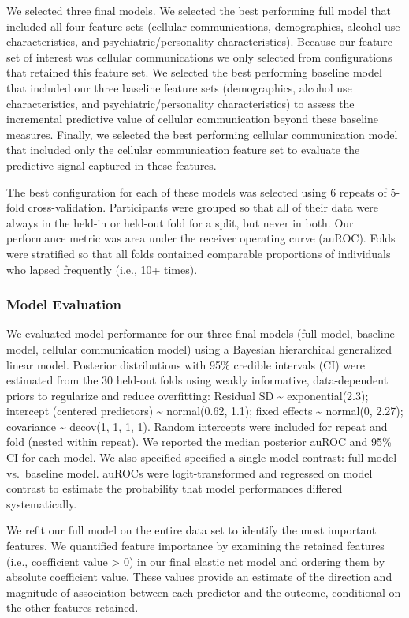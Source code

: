 \documentclass[
  letterpaper,
  DIV=11,
  numbers=noendperiod]{scrartcl}
\begin{document}
We selected three final models. We selected the best performing full
model that included all four feature sets (cellular communications,
demographics, alcohol use characteristics, and psychiatric/personality
characteristics). Because our feature set of interest was cellular
communications we only selected from configurations that retained this
feature set. We selected the best performing baseline model that
included our three baseline feature sets (demographics, alcohol use
characteristics, and psychiatric/personality characteristics) to assess
the incremental predictive value of cellular communication beyond these
baseline measures. Finally, we selected the best performing cellular
communication model that included only the cellular communication
feature set to evaluate the predictive signal captured in these
features.

The best configuration for each of these models was selected using 6
repeats of 5-fold cross-validation. Participants were grouped so that
all of their data were always in the held-in or held-out fold for a
split, but never in both. Our performance metric was area under the
receiver operating curve (auROC). Folds were stratified so that all
folds contained comparable proportions of individuals who lapsed
frequently (i.e., 10+ times).

\subsubsection{Model Evaluation}\label{model-evaluation}

We evaluated model performance for our three final models (full model,
baseline model, cellular communication model) using a Bayesian
hierarchical generalized linear model. Posterior distributions with 95\%
credible intervals (CI) were estimated from the 30 held-out folds using
weakly informative, data-dependent priors to regularize and reduce
overfitting: Residual SD \textasciitilde{} exponential(2.3); intercept
(centered predictors) \textasciitilde{} normal(0.62, 1.1); fixed effects
\textasciitilde{} normal(0, 2.27); covariance \textasciitilde{} decov(1,
1, 1, 1). Random intercepts were included for repeat and fold (nested
within repeat). We reported the median posterior auROC and 95\% CI for
each model. We also specified specified a single model contrast: full
model vs.~baseline model. auROCs were logit-transformed and regressed on
model contrast to estimate the probability that model performances
differed systematically.

We refit our full model on the entire data set to identify the most
important features. We quantified feature importance by examining the
retained features (i.e., coefficient value \textgreater{} 0) in our
final elastic net model and ordering them by absolute coefficient value.
These values provide an estimate of the direction and magnitude of
association between each predictor and the outcome, conditional on the
other features retained.
\end{document}
